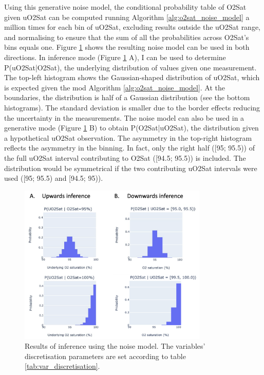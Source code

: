 Using this generative noise model, the conditional probability table of O2Sat given uO2Sat can be computed running Algorithm \ref{alg:o2sat_noise_model} a million times for each bin of uO2Sat, excluding results outside the uO2Sat range, and normalising to ensure that the sum of all the probabilities across O2Sat's bins equals one. 
Figure \ref{fig:o2sat_noise_model_cpt} shows the resulting \OXSat noise model can be used in both directions. 
In inference mode (Figure \ref{fig:o2sat_noise_model_cpt} A), I can be used to determine P(uO2Sat|O2Sat), the underlying distribution of \OXSat values given one measurement. The top-left histogram shows the Gaussian-shaped distribution of uO2Sat, which is expected given the mod Algorithm \ref{alg:o2sat_noise_model}. At the boundaries, the distribution is half of a Gaussian distribution (see the bottom histograms). The standard deviation is smaller due to the border effects reducing the uncertainty in the measurements. 
The noise model can also be used in a generative mode (Figure \ref{fig:o2sat_noise_model_cpt} B) to obtain P(O2Sat|uO2Sat), the distribution \OXSat given a hypothetical uO2Sat observation. The asymmetry in the top-right histogram reflects the asymmetry in the binning. In fact, only the right half ([95; 95.5)) of the full uO2Sat interval contributing to O2Sat  ([94.5; 95.5)) is included. The distribution would be symmetrical if the two contributing uO2Sat intervals were used ([95; 95.5) and [94.5; 95)).
\begin{figure}[!h]
    \centering
    \includegraphics[width=90mm]{Chapter1/Figs/o2sat_noise_model_cpt.png}
    \caption{Results of inference using the \OXSat noise model. The variables' discretisation parameters are set according to table \ref{tab:var_discretisation}.}
    \label{fig:o2sat_noise_model_cpt}
\end{figure}

